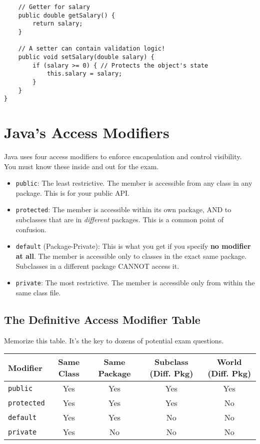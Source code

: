 \documentclass[12pt]{article}
\begin{document}
\begin{enumerate}[label=(\arabic*)]
\begin{verbatim}
    // Getter for salary
    public double getSalary() {
        return salary;
    }
    
    // A setter can contain validation logic!
    public void setSalary(double salary) {
        if (salary >= 0) { // Protects the object's state
            this.salary = salary;
        }
    }
}
\end{verbatim}

\section{Java's Access Modifiers}
Java uses four access modifiers to enforce encapsulation and control visibility. You must know these inside and out for the exam.

\begin{itemize}
    \item \texttt{public}: The least restrictive. The member is accessible from any class in any package. This is for your public API.
    \item \texttt{protected}: The member is accessible within its own package, AND to subclasses that are in \textit{different} packages. This is a common point of confusion.
    \item \texttt{default} (Package-Private): This is what you get if you specify \textbf{no modifier at all}. The member is accessible only to classes in the exact same package. Subclasses in a different package CANNOT access it.
    \item \texttt{private}: The most restrictive. The member is accessible only from within the same class file.
\end{itemize}

\subsection*{The Definitive Access Modifier Table}
Memorize this table. It's the key to dozens of potential exam questions.

\begin{tabular}{|l|c|c|c|c|}
\hline
\textbf{Modifier} & \textbf{Same Class} & \textbf{Same Package} & \textbf{Subclass (Diff. Pkg)} & \textbf{World (Diff. Pkg)}\\
\hline
\texttt{public} & Yes & Yes & Yes & Yes \\
\hline
\texttt{protected} & Yes & Yes & Yes & No \\
\hline
\texttt{default} & Yes & Yes & No & No \\
\hline
\texttt{private} & Yes & No & No & No \\
\hline
\end{tabular}


\end{enumerate}
\end{document}

